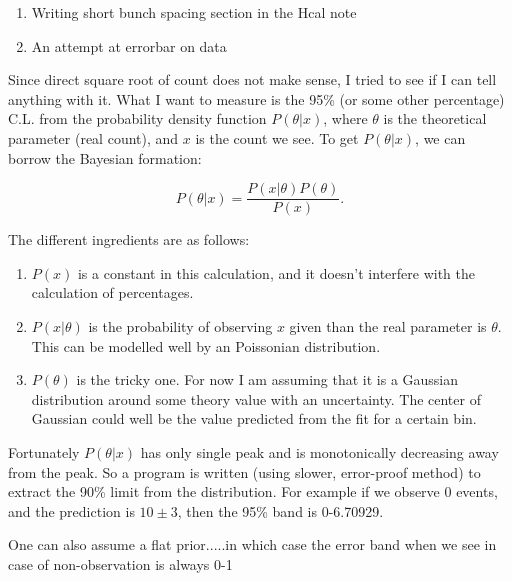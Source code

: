 

\begin{enumerate}
\item Writing short bunch spacing section in the Hcal note
\item An attempt at errorbar on data
\end{enumerate}


Since direct square root of count does not make sense, I tried to see if I can tell anything with it.
What I want to measure is the 95\% (or some other percentage) C.L. from the probability density function $P(\theta | x)$,
where $\theta$ is the theoretical parameter (real count), and $x$ is the count we see.
To get $P(\theta|x)$, we can borrow the Bayesian formation:

\begin{equation}
P(\theta | x) = \dfrac{P(x | \theta) P(\theta)}{P(x)}.\nonumber
\end{equation}

The different ingredients are as follows:

\begin{enumerate}
\item $P(x)$ is a constant in this calculation, and it doesn't interfere with the calculation of percentages.
\item $P(x | \theta)$ is the probability of observing $x$ given than the real parameter is $\theta$.  This can be modelled well by an Poissonian distribution.
\item $P(\theta)$ is the tricky one.  For now I am assuming that it is a Gaussian distribution around some theory value with an uncertainty.
The center of Gaussian could well be the value predicted from the fit for a certain bin.
\end{enumerate}

Fortunately $P(\theta | x)$ has only single peak and is monotonically decreasing away from the peak.
So a program is written (using slower, error-proof method) to extract the 90\% limit from the distribution.
For example if we observe 0 events, and the prediction is $10 \pm 3$, then the 95\% band is 0-6.70929.

One can also assume a flat prior.....in which case the error band when we see in case of non-observation is always 0-1









